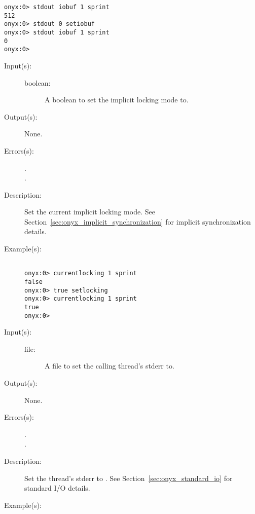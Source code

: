 \begin{description}
\begin{description}
\begin{verbatim}
onyx:0> stdout iobuf 1 sprint
512
onyx:0> stdout 0 setiobuf
onyx:0> stdout iobuf 1 sprint
0
onyx:0>
		\end{verbatim}
	\end{description}
\label{systemdict:setlocking}
\item[{\onyxop{boolean}{setlocking}{--}}: ]
	\begin{description}\item[]
	\item[Input(s): ]
		\begin{description}\item[]
		\item[boolean: ]
			A boolean to set the implicit locking mode to.
		\end{description}
	\item[Output(s): ] None.
	\item[Errors(s): ]
		\begin{description}\item[]
		\item[.]
		\item[.]
		\end{description}
	\item[Description: ]
		Set the current implicit locking mode.  See
		Section~\ref{sec:onyx_implicit_synchronization} for implicit
		synchronization details.
	\item[Example(s): ]\begin{verbatim}

onyx:0> currentlocking 1 sprint
false
onyx:0> true setlocking
onyx:0> currentlocking 1 sprint
true
onyx:0>
		\end{verbatim}
	\end{description}
\label{systemdict:setstderr}
\item[{\onyxop{file}{setstderr}{--}}: ]
	\begin{description}\item[]
	\item[Input(s): ]
		\begin{description}\item[]
		\item[file: ]
			A file to set the calling thread's stderr to.
		\end{description}
	\item[Output(s): ] None.
	\item[Errors(s): ]
		\begin{description}\item[]
		\item[.]
		\item[.]
		\end{description}
	\item[Description: ]
		Set the thread's stderr to .  See
		Section~\ref{sec:onyx_standard_io} for standard I/O details.
	\item[Example(s): ]\begin{verbatim}


\end{verbatim}
\end{description}
\end{description}
